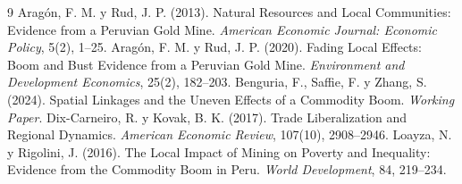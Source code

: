 \documentclass[11pt]{article}
\theoremstyle{definition}
\theoremstyle{plain}
\begin{document}
\begin{thebibliography}{9}
\setlength{\itemsep}{2pt}
Aragón, F. M. y Rud, J. P. (2013). Natural Resources and Local Communities: Evidence from a
Peruvian Gold Mine. \textit{American Economic Journal: Economic Policy}, 5(2), 1--25.
Aragón, F. M. y Rud, J. P. (2020). Fading Local Effects: Boom and Bust Evidence from a Peruvian
Gold Mine. \textit{Environment and Development Economics}, 25(2), 182--203.
Benguria, F., Saffie, F. y Zhang, S. (2024). Spatial Linkages and the Uneven Effects of a
Commodity Boom. \textit{Working Paper}.
Dix-Carneiro, R. y Kovak, B. K. (2017). Trade Liberalization and Regional Dynamics.
\textit{American Economic Review}, 107(10), 2908--2946.
Loayza, N. y Rigolini, J. (2016). The Local Impact of Mining on Poverty and Inequality:
Evidence from the Commodity Boom in Peru. \textit{World Development}, 84, 219--234.
\end{thebibliography}
\end{document}

